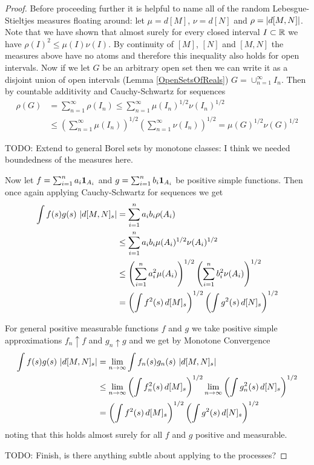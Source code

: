 \begin{proof}
Before proceeding further it is helpful to name all of the random Lebesgue-Stieltjes measures floating around: let $\mu = d[M]$, $\nu = d[N]$ and $\rho = \left \vert d[M,N] \right \vert$.  Note that we have shown that almost surely for every closed interval $I \subset \mathbb{R}$ we have $\rho(I)^2 \leq \mu(I) \nu(I)$.  By continuity of $[M]$, $[N]$ and $[M,N]$ the measures above have no atoms and therefore this inequality also holds for open intervals.  Now if we let $G$ be an arbitrary open set then we can write it as a disjoint union of open intervals (Lemma \ref{OpenSetsOfReals}) $G = \cup_{n=1}^\infty I_n$.  Then by countable additivity and Cauchy-Schwartz for sequences
\begin{align*}
\rho(G) &= \sum_{n=1}^\infty \rho(I_n) \leq \sum_{n=1}^\infty \mu(I_n)^{1/2}\nu(I_n)^{1/2} \\
&\leq \left( \sum_{n=1}^\infty \mu(I_n) \right)^{1/2}\left( \sum_{n=1}^\infty \nu(I_n) \right)^{1/2} = \mu(G)^{1/2}\nu(G)^{1/2}
\end{align*}

TODO: Extend to general Borel sets by monotone classes: I think we needed boundedness of the measures here.

Now let $f = \sum_{i=1}^n a_i \textbf{1}_{A_i}$ and $g = \sum_{i=1}^n b_i \textbf{1}_{A_i}$ be positive simple functions.  Then once again applying Cauchy-Schwartz for sequences we get
\begin{align*}
\int f(s) g(s) \, \left \vert d[M,N]_s \right \vert &= \sum_{i=1}^n a_i b_i \rho(A_i) \\
&\leq \sum_{i=1}^n a_ib_i \mu(A_i)^{1/2} \nu(A_i)^{1/2} \\
&\leq \left(\sum_{i=1}^n a_i^2 \mu(A_i) \right)^{1/2} \left( \sum_{i=1}^n b_i^2 \nu(A_i)\right)^{1/2} \\
&= \left( \int f^2(s) \, d[M]_s \right)^{1/2} \left( \int g^2(s) \, d[N]_s \right)^{1/2} 
\end{align*}


For general positive measurable functions $f$ and $g$ we take positive simple approximations $f_n \uparrow f$ and $g_n \uparrow g$ and we get by Monotone Convergence
\begin{align*}
\int f(s) g(s) \, \left \vert d[M,N]_s \right \vert &= \lim_{n \to \infty} \int f_n(s) g_n(s) \, \left \vert d[M,N]_s \right \vert \\
&\leq \lim_{n \to \infty}  \left( \int f_n^2(s) \, d[M]_s \right)^{1/2} \lim_{n \to \infty}\left( \int g_n^2(s) \, d[N]_s \right)^{1/2} \\
&= \left( \int f^2(s) \, d[M]_s \right)^{1/2} \left( \int g^2(s) \, d[N]_s \right)^{1/2} 
\end{align*}
noting that this holds almost surely for all $f$ and $g$ positive and measurable.

TODO: Finish, is there anything subtle about applying to the processes?
\end{proof}

